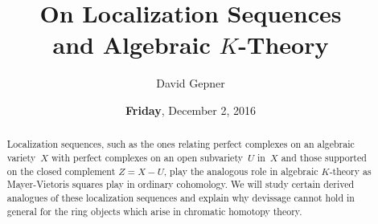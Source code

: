 \documentclass{UAmathtalk}
\author{David Gepner}
\title{On Localization Sequences\\ and Algebraic $K$-Theory}
\date{\textbf{Friday}, December 2, 2016}
\begin{document}
\maketitle

\begin{abstract}
Localization sequences, such as the ones relating perfect complexes on an algebraic variety~$X$ with perfect complexes on an open subvariety~$U$ in~$X$ and those supported on the closed complement $Z = X - U$, play the analogous role in algebraic $K$-theory as Mayer-Vietoris squares play in ordinary cohomology. We will study certain derived analogues of these localization sequences and explain why devissage cannot hold in general for the ring objects which arise in chromatic homotopy theory.
\end{abstract}
\end{document}
